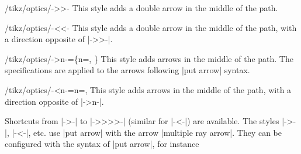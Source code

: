 \documentclass[a4paper]{ltxdoc}
\begin{document}
\begin{stylekey}{/tikz/optics/->>-}
  This style adds a double arrow in the middle of the path.
  \begin{codeexample}[width=6cm]
  \end{codeexample}
\end{stylekey}

\begin{stylekey}{/tikz/optics/-<<-}
  This style adds a double arrow in the middle of the path, with a direction opposite of |->>-|.
  \begin{codeexample}[width=6cm]
  \end{codeexample}
\end{stylekey}

\begin{stylekey}{/tikz/optics/->n-=\{n=, \}}
  This style adds  arrows in the middle of the path.
  The specifications  are applied to the arrows following |put arrow| syntax.
  \begin{codeexample}[width=6cm]
  \end{codeexample}
\end{stylekey}

\begin{stylekey}{/tikz/optics/-<n-={n=, }}
  This style adds  arrows in the middle of the path, with a direction opposite of |->n-|.
  \begin{codeexample}[width=6cm]
  \end{codeexample}
\end{stylekey}

Shortcuts from |->-| to |->>>>-| (similar for |-<-|) are available. The styles |->-|, |-<-|, etc. use |put arrow| with the arrow |multiple ray arrow|. They can be configured with the syntax of |put arrow|, for instance
\end{document}
